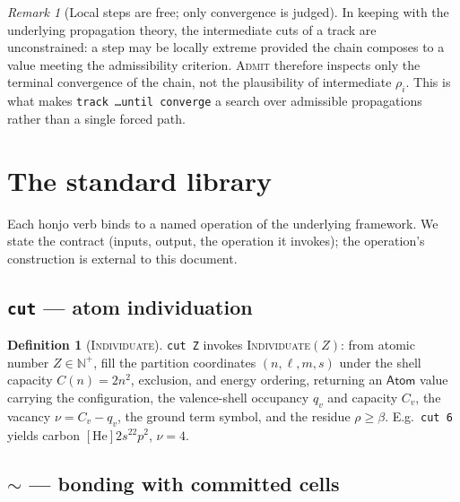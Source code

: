 \documentclass[11pt,twocolumn,a4paper]{article}
\theoremstyle{thmstyle}
\theoremstyle{definition}
\newtheorem{definition}[theorem]{Definition}
\theoremstyle{remark}
\newtheorem{remark}[theorem]{Remark}
\newcommand{\N}{\mathbb{N}}
\newcommand{\flo}{\beta}
\newcommand{\res}{\rho}
\newcommand{\hj}[1]{\texttt{#1}}
\begin{document}
\begin{remark}[Local steps are free; only convergence is judged]
\label{rem:local-free}
In keeping with the underlying propagation theory, the intermediate cuts
of a track are unconstrained: a step may be locally extreme provided the
chain composes to a value meeting the admissibility criterion.
\textsc{Admit} therefore inspects only the terminal convergence of the
chain, not the plausibility of intermediate $\res_i$. This is what makes
\hj{track \ldots until converge} a search over admissible propagations
rather than a single forced path.
\end{remark}

\section{The standard library}
\label{sec:stdlib}

Each honjo verb binds to a named operation of the underlying framework.
We state the contract (inputs, output, the operation it invokes); the
operation's construction is external to this document.

\subsection{\texorpdfstring{\hj{cut} --- atom individuation}{cut --- atom individuation}}
\label{sec:stdlib-atom}

\begin{definition}[\textsc{Individuate}]
\label{def:individuate}
\hj{cut Z} invokes \textsc{Individuate}$(Z)$: from atomic number
$Z\in\N^{+}$, fill the partition coordinates $(n,\ell,m,s)$ under the
shell capacity $C(n)=2n^2$, exclusion, and energy ordering, returning an
$\mathsf{Atom}$ value carrying the configuration, the valence-shell
occupancy $q_v$ and capacity $C_v$, the vacancy $\nu=C_v-q_v$, the ground
term symbol, and the residue $\res\ge\flo$. E.g.\ \hj{cut 6} yields
carbon $[\mathrm{He}]2s^22p^2$, $\nu=4$.
\end{definition}

\subsection{\texorpdfstring{\hj{$\sim$} --- bonding with committed cells}{~ --- bonding with committed cells}}
\label{sec:stdlib-bond}
\end{document}
